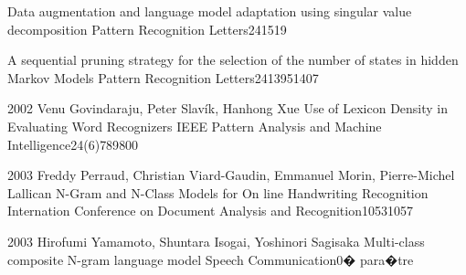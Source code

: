 

{Data augmentation and language model adaptation using singular value decomposition}
{Pattern Recognition Letters}{24}{15}{19}

{A sequential pruning strategy for the selection of the number of states in hidden Markov Models}
{Pattern Recognition Letters}{24}{1395}{1407}

 {2002} {Venu Govindaraju, Peter Slav\'ik, Hanhong Xue}
{Use of Lexicon Density in Evaluating Word Recognizers}
{IEEE Pattern Analysis and Machine Intelligence}{24(6)}{789}{800}

 {2003} {Freddy Perraud, Christian Viard-Gaudin, Emmanuel Morin, Pierre-Michel Lallican}
{N-Gram and N-Class Models for On line Handwriting Recognition}
{Internation Conference on Document Analysis and Recognition}{}{1053}{1057}

 {2003} {Hirofumi Yamamoto, Shuntara Isogai, Yoshinori Sagisaka}
{Multi-class composite N-gram language model}
{Speech Communication}{}{0}{� para�tre}

